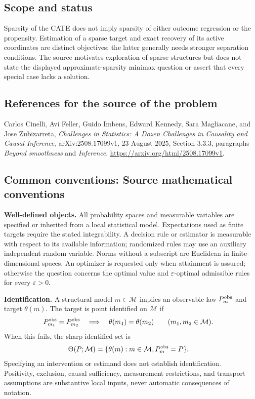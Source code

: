 \documentclass[11pt,a4paper]{article}
\begin{document}
\subsection*{Scope and status}
Sparsity of the CATE does not imply sparsity of either outcome regression or the propensity. Estimation of a sparse target and exact recovery of its active coordinates are distinct objectives; the latter generally needs stronger separation conditions. The source motivates exploration of sparse structures but does not state the displayed approximate-sparsity minimax question or assert that every special case lacks a solution.
\subsection*{References for the source of the problem}
Carlos Cinelli, Avi Feller, Guido Imbens, Edward Kennedy, Sara Magliacane, and Jose Zubizarreta, \emph{Challenges in Statistics: A Dozen Challenges in Causality and Causal Inference}, arXiv:2508.17099v1, 23 August 2025, Section 3.3.3, paragraphs \emph{Beyond smoothness} and \emph{Inference}. \url{https://arxiv.org/html/2508.17099v1}.

\subsection*{Common conventions: Source mathematical conventions}

\textbf{Well-defined objects.}
All probability spaces and measurable variables are specified or inherited
from a local statistical model. Expectations used as finite targets require
the stated integrability. A decision rule or estimator is measurable with
respect to its available information; randomized rules may use an auxiliary
independent random variable. Norms without a subscript are Euclidean in
finite-dimensional spaces. An optimizer is requested only when attainment
is assured; otherwise the question concerns the optimal value and
$\varepsilon$-optimal admissible rules for every $\varepsilon>0$.

\textbf{Identification.}
A structural model $m\in\mathcal M$ implies an observable law
$P_m^{\rm obs}$ and target $\theta(m)$. The target is point identified on
$\mathcal M$ if
\[
 P_{m_1}^{\rm obs}=P_{m_2}^{\rm obs}
 \quad\Longrightarrow\quad\theta(m_1)=\theta(m_2)
 \qquad(m_1,m_2\in\mathcal M).
\]
When this fails, the sharp identified set is
\[
 \Theta(P;\mathcal M)=\{\theta(m):m\in\mathcal M,
                                  P_m^{\rm obs}=P\}.
\]
Specifying an intervention or estimand does not establish identification.
Positivity, exclusion, causal sufficiency, measurement restrictions, and
transport assumptions are substantive local inputs, never automatic
consequences of notation.
\end{document}
